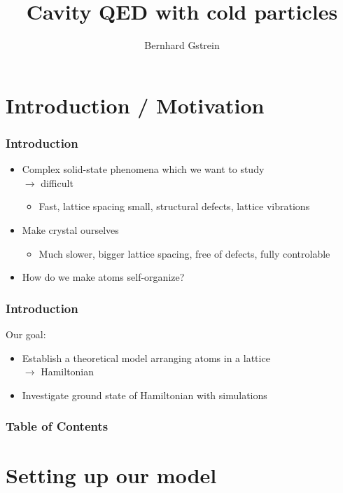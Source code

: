 \documentclass[pdflatex,compress]{beamer}
\title{Cavity QED with cold particles}
\author{Bernhard Gstrein}
\begin{document}
\maketitle

\AtBeginSection[]{}
\section{Introduction / Motivation}

\begin{frame}
\frametitle{Introduction}
\begin{itemize}
	\item Complex solid-state phenomena which we want to study \\
	$\rightarrow$ difficult
		\begin{itemize}
			\item Fast, lattice spacing small, structural defects, lattice vibrations
		\end{itemize}
	\item Make crystal ourselves
		\begin{itemize}
		\item Much slower, bigger lattice spacing, free of defects, fully controlable
		\end{itemize}
	\item How do we make atoms self-organize?
\end{itemize}
\end{frame}

\begin{frame}
\frametitle{Introduction}
Our goal:
\begin{itemize}
	\item Establish a theoretical model arranging atoms in a lattice \\
	$\rightarrow$ Hamiltonian
	\item Investigate ground state of Hamiltonian with simulations
\end{itemize}
\end{frame}

\begin{frame}
\frametitle{Table of Contents}
\tableofcontents
\end{frame}


\section{Setting up our model}
\end{document}
